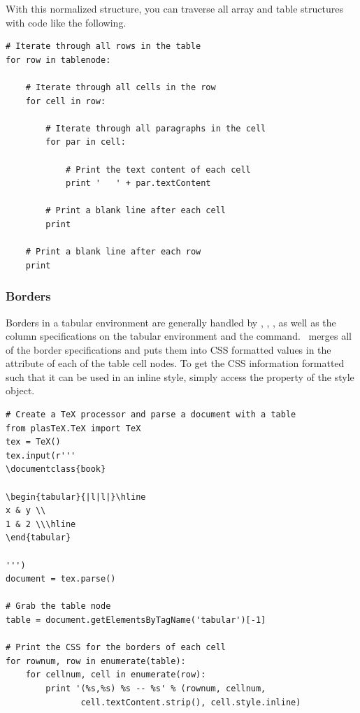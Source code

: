 With this normalized structure, you can traverse all array and table 
structures with code like the following.
\begin{verbatim}
# Iterate through all rows in the table
for row in tablenode:

    # Iterate through all cells in the row
    for cell in row:

        # Iterate through all paragraphs in the cell
        for par in cell:

            # Print the text content of each cell
            print '   ' + par.textContent 

        # Print a blank line after each cell
        print

    # Print a blank line after each row
    print
\end{verbatim}


\subsubsection{Borders}

Borders in a tabular environment are generally handled by ,
, , as well as the column specifications on 
the tabular environment and the  command.  
\plasTeX\ merges all of the border specifications and puts them into 
CSS formatted values in the  attribute of each of the 
table cell nodes.  To get the CSS information formatted such that it
can be used in an inline style, simply access the  property
of the style object. 

\begin{verbatim}
# Create a TeX processor and parse a document with a table
from plasTeX.TeX import TeX
tex = TeX()
tex.input(r'''
\documentclass{book}

\begin{tabular}{|l|l|}\hline
x & y \\
1 & 2 \\\hline
\end{tabular}

''')
document = tex.parse()

# Grab the table node
table = document.getElementsByTagName('tabular')[-1]

# Print the CSS for the borders of each cell
for rownum, row in enumerate(table):
    for cellnum, cell in enumerate(row):
        print '(%s,%s) %s -- %s' % (rownum, cellnum, 
               cell.textContent.strip(), cell.style.inline)
\end{verbatim}

